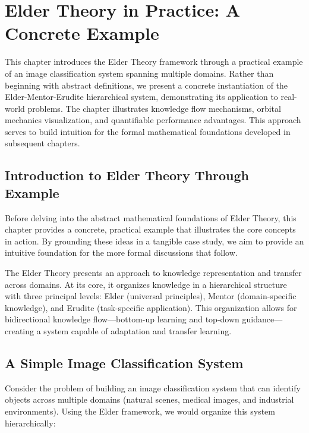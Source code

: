\chapter{Elder Theory in Practice: A Concrete Example}

\begin{chapterabstract}
This chapter introduces the Elder Theory framework through a practical example of an image classification system spanning multiple domains. Rather than beginning with abstract definitions, we present a concrete instantiation of the Elder-Mentor-Erudite hierarchical system, demonstrating its application to real-world problems. The chapter illustrates knowledge flow mechanisms, orbital mechanics visualization, and quantifiable performance advantages. This approach serves to build intuition for the formal mathematical foundations developed in subsequent chapters.
\end{chapterabstract}

\section{Introduction to Elder Theory Through Example}

Before delving into the abstract mathematical foundations of Elder Theory, this chapter provides a concrete, practical example that illustrates the core concepts in action. By grounding these ideas in a tangible case study, we aim to provide an intuitive foundation for the more formal discussions that follow.

The Elder Theory presents an approach to knowledge representation and transfer across domains. At its core, it organizes knowledge in a hierarchical structure with three principal levels: Elder (universal principles), Mentor (domain-specific knowledge), and Erudite (task-specific application). This organization allows for bidirectional knowledge flow—bottom-up learning and top-down guidance—creating a system capable of adaptation and transfer learning.

\section{A Simple Image Classification System}

Consider the problem of building an image classification system that can identify objects across multiple domains (natural scenes, medical images, and industrial environments). Using the Elder framework, we would organize this system hierarchically:

